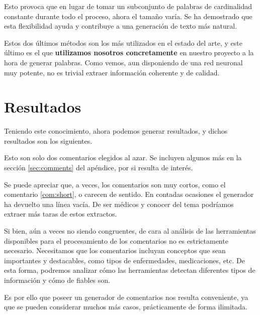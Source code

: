 Esto provoca que en lugar de tomar un subconjunto de palabras de cardinalidad constante durante todo el proceso, ahora el tamaño varía. Se ha demostrado que esta flexibilidad ayuda y contribuye a una generación de texto más natural.

Estos dos últimos métodos son los más utilizados en el estado del arte, y este último es el que \textbf{utilizamos nosotros concretamente} en nuestro proyecto a la hora de generar palabras. Como vemos, aun disponiendo de una red neuronal muy potente, no es trivial extraer información coherente y de calidad.



\section{Resultados}
Teniendo este conocimiento, ahora podemos generar resultados, y dichos resultados son los siguientes.

\begin{thm}
\end{thm}
\begin{thm}
\end{thm}

Esto son solo dos comentarios elegidos al azar. Se incluyen algunos más en la sección \ref{sec:comments} del apéndice, por si resulta de interés.

Se puede apreciar que, a veces, los comentarios son muy cortos, como el comentario \ref{com:short}, o carecen de sentido. En contadas ocasiones el generador ha devuelto una línea vacía. De ser médicos y conocer del tema podríamos extraer más taras de estos extractos. 

Si bien, aún a veces no siendo congruentes, de cara al análisis de las herramientas disponibles para el procesamiento de los comentarios no es estrictamente necesario. Necesitamos que los comentarios incluyan conceptos que sean importantes y destacables, como tipos de enfermedades, medicaciones, etc. De esta forma, podremos analizar cómo las herramientas detectan diferentes tipos de información y cómo de fiables son. 

Es por ello que poseer un generador de comentarios nos resulta conveniente, ya que se pueden considerar muchos más casos, prácticamente de forma ilimitada.